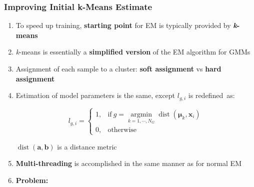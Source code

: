 \documentclass[usenames,dvipsnames]{beamer}
\DeclareMathOperator*{\argmin}{argmin}
\def\Vec#1{{\boldsymbol{#1}}}
\begin{document}
\begin{frame}
\begin{enumerate}[{~~$\boldsymbol{\bullet}$}]
\end{enumerate}
\end{frame}
%
%
%

\begin{frame}
\frametitle{Improving Initial k-Means Estimate}

\begin{enumerate}[{~~$\boldsymbol{\bullet}$}]

\item
To speed up training, {\bf starting point} for EM is typically provided by \textbf{\textit{k}-means}
\vspace{0.5ex}

\item
{\it k}-means is essentially a {\bf simplified version} of the EM algorithm for GMMs
\vspace{0.5ex}

\item
Assignment of each sample to a cluster: {\bf soft assignment} vs {\bf hard assignment}
\vspace{0.5ex}

\item
Estimation of model parameters is the same, except $l_{g,i}$ is redefined~as:%

\vspace{-1.5ex}
\begin{minipage}{1\textwidth}
\begin{minipage}{0.5\textwidth}
\begin{equation*}
  l_{g,i} = \left\{
  \begin{array}{ll}
  1, & \mbox{if} ~ g = \argmin\limits_{k=1, \cdots, N_G} \operatorname{dist}(\Vec{\mu}_k, \Vec{x}_i) \\
  0, & \mbox{otherwise}
  \end{array}
  \right.
\end{equation*}%
\end{minipage}
\begin{minipage}{0.5\textwidth}
{$\operatorname{dist}(\Vec{a}, \Vec{b})$} is a distance metric
\end{minipage}
\end{minipage}
\vspace{0.5ex}


\item 
{\bf Multi-threading} is accomplished in the same manner as for normal EM
\vspace{0.5ex}

\item
{\bf Problem:}
\begin{enumerate}[{$\boldsymbol{\rightarrow}$}]
\renewcommand{\itemsep}{0.9ex}


\end{enumerate}
\end{enumerate}
\end{frame}
\end{document}

